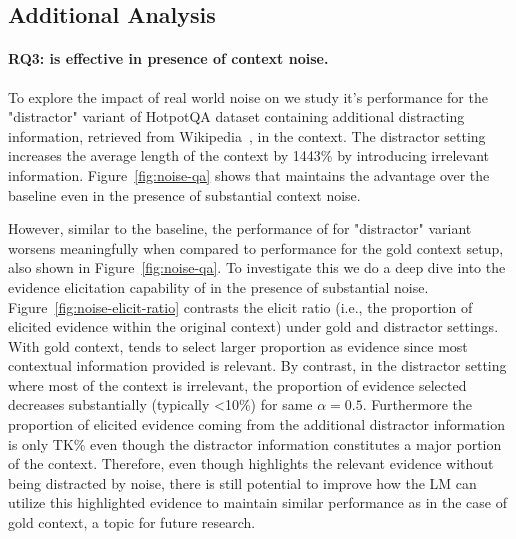 \subsection{Additional Analysis}\label{sec:exp-analysis}
\vspace{-0.5em}

\paragraph{RQ3: \se is effective in presence of context noise.}
To explore the impact of real world noise on \se we study it's performance for the "distractor" variant of HotpotQA dataset containing additional distracting information, retrieved from Wikipedia~\cite{yang2018hotpotqa}, in the context. The distractor setting increases the average length of the context by 1443\% by introducing irrelevant information. Figure~\ref{fig:noise-qa} shows that \se maintains the advantage over the baseline even in the presence of substantial context noise. 

However, similar to the baseline, the performance of \se for "distractor" variant worsens meaningfully when compared to \se performance for the gold context setup, also shown in Figure~\ref{fig:noise-qa}. To investigate this we do a deep dive into the evidence elicitation capability of \se in the presence of substantial noise. Figure~\ref{fig:noise-elicit-ratio} contrasts the elicit ratio (i.e., the proportion of elicited evidence within the original context) under gold and distractor settings. With gold context, \se tends to select larger proportion as evidence since most contextual information provided is relevant. By contrast, in the distractor setting where most of the context is irrelevant, the proportion of evidence selected decreases substantially (typically <10\%) for same $\alpha=0.5$. Furthermore the proportion of elicited evidence coming from the additional distractor information is only TK\% even though the distractor information constitutes a major portion of the context. Therefore, even though \se highlights the relevant evidence without being distracted by noise, there is still potential to improve how the LM can utilize this highlighted evidence to maintain similar performance as in the case of gold context, a topic for future research. 

